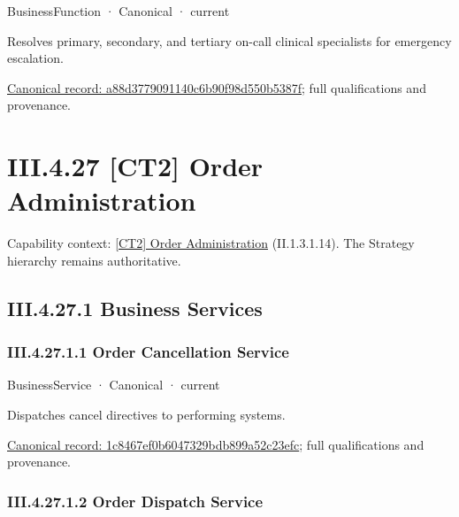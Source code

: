 \label{element:a88d3779091140c6b90f98d550b5387f}
{\small BusinessFunction · Canonical · current}\par

Resolves primary, secondary, and tertiary on-call clinical specialists for emergency escalation.


{\footnotesize \href{../../../../continuum/business/business-function/a88d3779091140c6b90f98d550b5387f.md}{Canonical record: a88d3779091140c6b90f98d550b5387f}; full qualifications and provenance.}\par
\section*{III.4.27 [CT2] Order Administration}
\label{navigation:III.4.27}

{\small Capability context: \hyperref[element:c3c5abd7987f4433a46cbfed8167914c]{[CT2] Order Administration} (II.1.3.1.14). The Strategy hierarchy remains authoritative.}\par
\subsection*{III.4.27.1 Business Services}
\label{navigation:III.4.27.1}

\subsubsection*{III.4.27.1.1 Order Cancellation Service}
\label{navigation:III.4.27.1.1}

\label{element:1c8467ef0b6047329bdb899a52c23efc}
{\small BusinessService · Canonical · current}\par

Dispatches cancel directives to performing systems.


{\footnotesize \href{../../../../continuum/business/business-service/1c8467ef0b6047329bdb899a52c23efc.md}{Canonical record: 1c8467ef0b6047329bdb899a52c23efc}; full qualifications and provenance.}\par
\subsubsection*{III.4.27.1.2 Order Dispatch Service}
\label{navigation:III.4.27.1.2}

